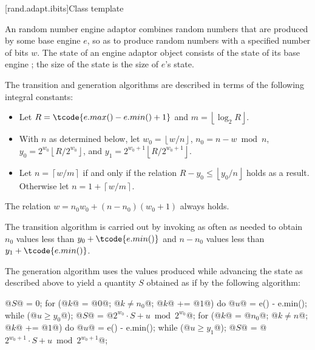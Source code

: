
[rand.adapt.ibits]{Class template }%
%

\pnum
An 
random number engine adaptor
combines random numbers
that are produced by some base engine $e$,
so as to produce random numbers
with a specified number of bits $w$.
The state 
of an 
engine adaptor object 
consists of
 the state  of its base engine ;
the size of the state is
 the size of $e$'s state.

\pnum
The transition and generation algorithms
are described in terms
of the following integral constants:%
\begin{itemize}
 \item
   Let
     $R = \tcode{e.max() - e.min() + 1}$
   and
     $m = \left\lfloor \log_2 R \right\rfloor$.
 \item
   With $n$ as determined below,
   let
     $w_0 = \left\lfloor w / n \right\rfloor$,
     $n_0 = n - w \bmod n$,
     $y_0 = 2^{w_0} \left\lfloor R / 2^{w_0} \right\rfloor$,
   and
     $y_1 = 2^{w_0 + 1} \left\lfloor R / 2^{w_0 + 1} \right\rfloor$.
 \item
   Let
     $n = \left\lceil w / m \right\rceil$
   if and only if the relation
     $R - y_0 \leq \left\lfloor y_0 / n \right\rfloor$
   holds as a result.
   Otherwise let
     $n = 1 + \left\lceil w / m \right\rceil$.
\end{itemize}
\begin{note}
 The relation
 $w = n_0 w_0 + (n - n_0)(w_0 + 1)$
 always holds.
\end{note}

\pnum
The transition algorithm
is carried out by invoking 
as often as needed to obtain $n_0$
values less than $y_0 + \tcode{e.min()}$
and $n - n_0$ values less than $y_1 + \tcode{e.min()}$.

\pnum
The generation algorithm
uses the values produced
while advancing the state as described above
to yield a quantity $S$
obtained as if by the following algorithm:
\begin{codeblock}
@$S$@ = 0;
for (@$k$@ = @$0$@; @$k \neq n_0$@; @$k$@ += @$1$@)  {
 do @$u$@ = e() - e.min(); while (@$u \ge y_0$@);
 @$S$@ = @$2^{w_0} \cdot S + u \bmod 2^{w_0}$@;
}
for (@$k$@ = @$n_0$@; @$k \neq n$@; @$k$@ += @$1$@)  {
 do @$u$@ = e() - e.min(); while (@$u \ge y_1$@);
 @$S$@ = @$2^{w_0 + 1} \cdot S + u \bmod 2^{w_0 + 1}$@;
}
\end{codeblock}

